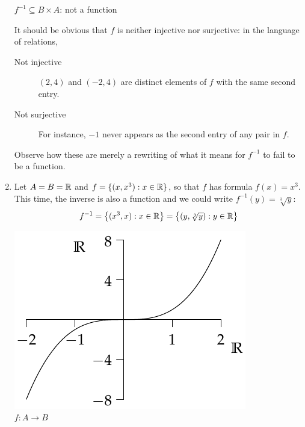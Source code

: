 \begin{examples}{}{}
\begin{enumerate}
\begin{center}
\begin{minipage}{0.35\textwidth}
				$f^{-1}\subseteq B\times A$: not a function
			\end{minipage}
		\end{center}
		It should be obvious that $f$ is neither injective nor surjective: in the language of relations,
		\begin{description}
			\item[Not injective]\quad $(2,4)$ and $(-2,4)$ are distinct elements of $f$ with the same second entry.
			\item[Not surjective]\quad For instance, $-1$ never appears as the second entry of any pair in $f$.
		\end{description}
		Observe how these are merely a rewriting of what it means for $f^{-1}$ to fail to be a function.
		
		\item\label{ex:reln2} Let $A=B=\mathbb{R}$ and $f=\{(x,x^3):x\in\mathbb{R}\}$, so that $f$ has formula $f(x)=x^3$. This time, the inverse is also a function and we could write $f^{-1}(y)=\sqrt[3]{y}$:
		\[
			f^{-1}=\bigl\{(x^3,x):x\in\mathbb{R}\bigr\}=\bigl\{(y,\sqrt[3]{y}):y\in\mathbb{R}\bigr\}
		\]
		\begin{center}
			\begin{minipage}{0.35\textwidth}\centering
				\includegraphics[width=\textwidth]{relations-22-reln3}\\
				$f:A\to B$
			\end{minipage}\qquad\qquad\qquad
			\begin{minipage}{0.35\textwidth}\centering

\end{minipage}
\end{center}
\end{enumerate}
\end{examples}
